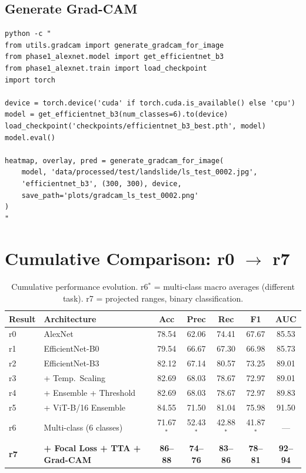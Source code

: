 \documentclass[11pt]{article}
\begin{document}
\subsection{Generate Grad-CAM}
\begin{verbatim}
python -c "
from utils.gradcam import generate_gradcam_for_image
from phase1_alexnet.model import get_efficientnet_b3
from phase1_alexnet.train import load_checkpoint
import torch

device = torch.device('cuda' if torch.cuda.is_available() else 'cpu')
model = get_efficientnet_b3(num_classes=6).to(device)
load_checkpoint('checkpoints/efficientnet_b3_best.pth', model)
model.eval()

heatmap, overlay, pred = generate_gradcam_for_image(
    model, 'data/processed/test/landslide/ls_test_0002.jpg',
    'efficientnet_b3', (300, 300), device,
    save_path='plots/gradcam_ls_test_0002.png'
)
"
\end{verbatim}

\section{Cumulative Comparison: r0 $\to$ r7}

\begin{table}[H]
\centering
\small
\renewcommand{\arraystretch}{1.2}
\begin{tabular}{llccccc}
\toprule
\textbf{Result} & \textbf{Architecture} & \textbf{Acc} & \textbf{Prec} & \textbf{Rec} & \textbf{F1} & \textbf{AUC} \\
\midrule
r0 & AlexNet & 78.54 & 62.06 & 74.41 & 67.67 & 85.53 \\
r1 & EfficientNet-B0 & 79.54 & 66.67 & 67.30 & 66.98 & 85.73 \\
r2 & EfficientNet-B3 & 82.12 & 67.14 & 80.57 & 73.25 & 89.01 \\
r3 & + Temp.\ Scaling & 82.69 & 68.03 & 78.67 & 72.97 & 89.01 \\
r4 & + Ensemble + Threshold & 82.69 & 68.03 & 78.67 & 72.97 & 89.83 \\
r5 & + ViT-B/16 Ensemble & 84.55 & 71.50 & 81.04 & 75.98 & 91.50 \\
r6 & Multi-class (6 classes) & 71.67$^*$ & 52.43$^*$ & 42.88$^*$ & 41.87$^*$ & --- \\
\rowcolor{bestgreen}
\textbf{r7} & \textbf{+ Focal Loss + TTA + Grad-CAM} & \textbf{86--88} & \textbf{74--76} & \textbf{83--86} & \textbf{78--81} & \textbf{92--94} \\
\bottomrule
\end{tabular}
\caption{Cumulative performance evolution. r6$^*$ = multi-class macro averages (different task). r7 = projected ranges, binary classification.}
\end{table}
\end{document}
